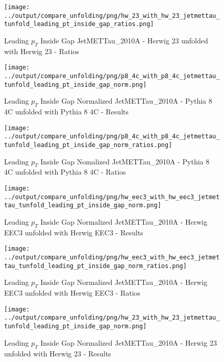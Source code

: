 \documentclass[11pt]{book}
\begin{document}
\begin{figure}[ht]
\centering
\texttt{[image: ../output/compare\_unfolding/png/hw\_23\_with\_hw\_23\_jetmettau\_tunfold\_leading\_pt\_inside\_gap\_ratios.png]}
\caption{Leading $p_{T}$ Inside Gap JetMETTau\_2010A - Herwig 23 unfolded with Herwig 23 - Ratios}
\label{hw_23_hw_23_jetmettau_tunfold_leading_pt_inside_gap_b}
\end{figure}


\begin{figure}[ht]
\centering
\texttt{[image: ../output/compare\_unfolding/png/p8\_4c\_with\_p8\_4c\_jetmettau\_tunfold\_leading\_pt\_inside\_gap\_norm.png]}
\caption{Leading $p_{T}$ Inside Gap Normalized JetMETTau\_2010A - Pythia 8 4C unfolded with Pythia 8 4C - Results}
\label{p8_p8_jetmettau_tunfold_leading_pt_inside_gap_norm_a}
\end{figure}

\begin{figure}[ht]
\centering
\texttt{[image: ../output/compare\_unfolding/png/p8\_4c\_with\_p8\_4c\_jetmettau\_tunfold\_leading\_pt\_inside\_gap\_norm\_ratios.png]}
\caption{Leading $p_{T}$ Inside Gap Nomalized JetMETTau\_2010A - Pythia 8 4C unfolded with Pythia 8 4C - Ratios}
\label{p8_p8_jetmettau_tunfold_leading_pt_inside_gap_norm_b}
\end{figure}

\begin{figure}[ht]
\centering
\texttt{[image: ../output/compare\_unfolding/png/hw\_eec3\_with\_hw\_eec3\_jetmettau\_tunfold\_leading\_pt\_inside\_gap\_norm.png]}
\caption{Leading $p_{T}$ Inside Gap Normalized JetMETTau\_2010A - Herwig EEC3 unfolded with Herwig EEC3 - Results}
\label{hw_eec3_hw_eec3_jetmettau_tunfold_leading_pt_inside_gap_norm_a}
\end{figure}

\begin{figure}[ht]
\centering
\texttt{[image: ../output/compare\_unfolding/png/hw\_eec3\_with\_hw\_eec3\_jetmettau\_tunfold\_leading\_pt\_inside\_gap\_norm\_ratios.png]}
\caption{Leading $p_{T}$ Inside Gap Normalized JetMETTau\_2010A - Herwig EEC3 unfolded with Herwig EEC3 - Ratios}
\label{hw_eec3_hw_eec3_jetmettau_tunfold_leading_pt_inside_gap_norm_b}
\end{figure}

\begin{figure}[ht]
\centering
\texttt{[image: ../output/compare\_unfolding/png/hw\_23\_with\_hw\_23\_jetmettau\_tunfold\_leading\_pt\_inside\_gap\_norm.png]}
\caption{Leading $p_{T}$ Inside Gap Normalized JetMETTau\_2010A - Herwig 23 unfolded with Herwig 23 - Results}
\label{hw_23_hw_23_jetmettau_tunfold_leading_pt_inside_gap_norm_a}
\end{figure}
\end{document}
